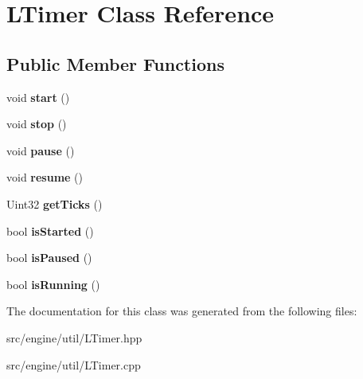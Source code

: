 \hypertarget{class_l_timer}{}\section{L\+Timer Class Reference}
\label{class_l_timer}
\subsection*{Public Member Functions}
\begin{DoxyCompactItemize}
\item 
void {\bfseries start} ()\hypertarget{class_l_timer_a7dc11f05cf5098a6d06ebd6ebec96ed6}{}\label{class_l_timer_a7dc11f05cf5098a6d06ebd6ebec96ed6}

\item 
void {\bfseries stop} ()\hypertarget{class_l_timer_aeabbf5f935907fcfeaa7f4403741e4ae}{}\label{class_l_timer_aeabbf5f935907fcfeaa7f4403741e4ae}

\item 
void {\bfseries pause} ()\hypertarget{class_l_timer_a8a6c6af5435bdaa825a30f84877dc059}{}\label{class_l_timer_a8a6c6af5435bdaa825a30f84877dc059}

\item 
void {\bfseries resume} ()\hypertarget{class_l_timer_a27355a22a0a159e8e48e9fe1529399f0}{}\label{class_l_timer_a27355a22a0a159e8e48e9fe1529399f0}

\item 
Uint32 {\bfseries get\+Ticks} ()\hypertarget{class_l_timer_a57c4bdca0f7bdd75c65b6ab1499de1e7}{}\label{class_l_timer_a57c4bdca0f7bdd75c65b6ab1499de1e7}

\item 
bool {\bfseries is\+Started} ()\hypertarget{class_l_timer_a102ca688eaa4109dd733b4b60a29d27c}{}\label{class_l_timer_a102ca688eaa4109dd733b4b60a29d27c}

\item 
bool {\bfseries is\+Paused} ()\hypertarget{class_l_timer_ae1d9b504da6ed0f42e10f2338a9f88bb}{}\label{class_l_timer_ae1d9b504da6ed0f42e10f2338a9f88bb}

\item 
bool {\bfseries is\+Running} ()\hypertarget{class_l_timer_a103d426dfcf480bc3938ef41023af629}{}\label{class_l_timer_a103d426dfcf480bc3938ef41023af629}

\end{DoxyCompactItemize}


The documentation for this class was generated from the following files\+:\begin{DoxyCompactItemize}
\item 
src/engine/util/L\+Timer.\+hpp\item 
src/engine/util/L\+Timer.\+cpp\end{DoxyCompactItemize}
